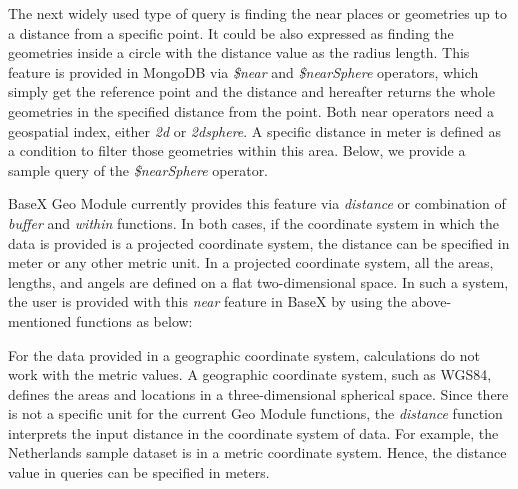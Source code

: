 \documentclass[a4paper,12pt]{article}
\begin{document}
The next widely used type of query is finding the near places or geometries up to a distance from a specific point. It could be also expressed as finding the geometries inside a circle with the distance value as the radius length. This feature is provided in MongoDB via \textit{\$near} and \textit{\$nearSphere} operators, which simply get the reference point and the distance and hereafter returns the whole geometries in the specified distance from the point. Both near operators need a geospatial index, either \textit{2d} or \textit{2dsphere}. A specific distance in meter is defined as a condition to filter those geometries within this area. Below, we provide a sample query of the \textit{\$nearSphere} operator.  
\vspace{10px}
\vspace{10px}
BaseX Geo Module currently provides this feature via \textit{distance} or combination of \textit{buffer} and \textit{within} functions. In both cases, if the coordinate system in which the data is provided is a projected coordinate system, the distance can be specified in meter or any other metric unit. In a projected coordinate system, all the areas, lengths, and angels are defined on a flat two-dimensional space. In such a system, the user is provided with this \textit{near} feature in BaseX by using the above-mentioned functions as below:
\vspace{10px}
\vspace{10px}


For the data provided in a geographic coordinate system, calculations do not work with the metric values. A geographic coordinate system, such as WGS84, defines the areas and locations in a three-dimensional spherical space. Since there is not a specific unit for the current Geo Module functions, the \textit{distance} function interprets the input distance in the coordinate system of data. For example, the Netherlands sample dataset is in a metric coordinate system. Hence, the distance value in queries can be specified in meters. %
\end{document}
